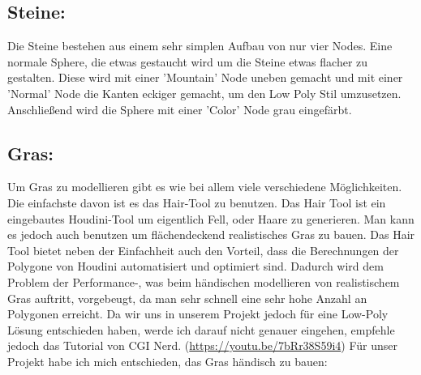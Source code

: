 \documentclass[paper=a4,fontsize=12pt,ngerman]{scrartcl}
\begin{document}
	\subsection*{Steine:}
	Die Steine bestehen aus einem sehr simplen Aufbau von nur vier Nodes. Eine normale Sphere, die etwas gestaucht wird um die Steine etwas flacher zu gestalten. Diese wird mit einer 'Mountain' Node uneben gemacht und mit einer 'Normal' Node die Kanten eckiger gemacht, um den Low Poly Stil umzusetzen. Anschließend wird die Sphere mit einer 'Color' Node grau eingefärbt.
	
	\subsection*{Gras:}
	Um Gras zu modellieren gibt es wie bei allem viele verschiedene Möglichkeiten. Die einfachste davon ist es das Hair-Tool zu benutzen. Das Hair Tool ist ein eingebautes Houdini-Tool um eigentlich Fell, oder Haare zu generieren. Man kann es jedoch auch benutzen um flächendeckend realistisches Gras zu bauen. Das Hair Tool bietet neben der Einfachheit auch den Vorteil, dass die Berechnungen der Polygone von Houdini automatisiert und optimiert sind. Dadurch wird dem Problem der Performance-, was beim händischen modellieren von realistischem Gras auftritt, vorgebeugt, da man sehr schnell eine sehr hohe Anzahl an Polygonen erreicht. Da wir uns in unserem Projekt jedoch für eine Low-Poly Lösung entschieden haben, werde ich darauf nicht genauer eingehen, empfehle jedoch das Tutorial von CGI Nerd. (\url{https://youtu.be/7bRr38S59i4})
	Für unser Projekt habe ich mich entschieden, das Gras händisch zu bauen:
\end{document}
